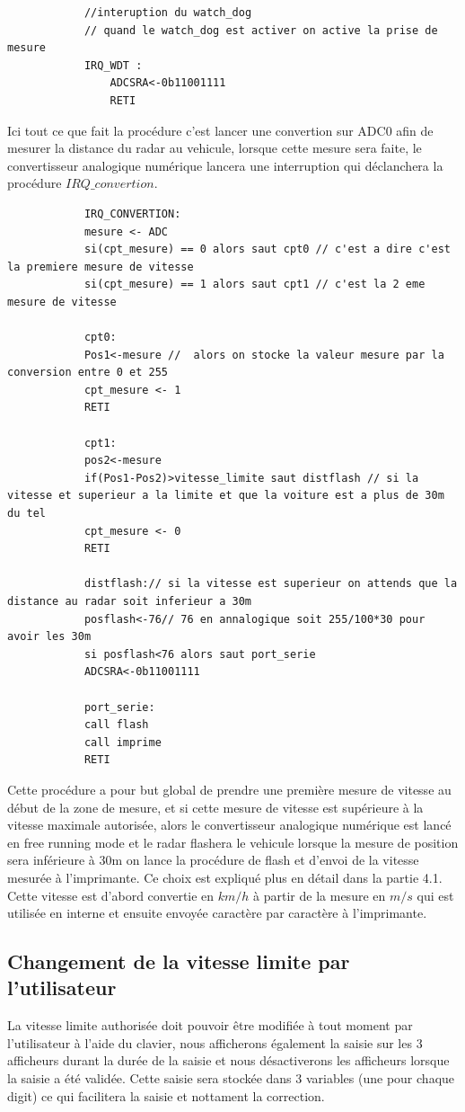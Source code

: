 \documentclass[a4paper, 12pt]{article}
\begin{document}
		\begin{lstlisting}
			//interuption du watch_dog
			// quand le watch_dog est activer on active la prise de mesure
			IRQ_WDT :
				ADCSRA<-0b11001111
				RETI
		\end{lstlisting}
		Ici tout ce que fait la procédure c'est lancer une convertion sur ADC0 afin de mesurer la distance du radar au vehicule, lorsque cette mesure sera faite, le convertisseur analogique numérique lancera une interruption qui déclanchera la procédure $IRQ\_convertion$.\\
		
		\begin{lstlisting}
			IRQ_CONVERTION:
			mesure <- ADC
			si(cpt_mesure) == 0 alors saut cpt0 // c'est a dire c'est la premiere mesure de vitesse 
			si(cpt_mesure) == 1 alors saut cpt1 // c'est la 2 eme mesure de vitesse
			
			cpt0:
			Pos1<-mesure //  alors on stocke la valeur mesure par la conversion entre 0 et 255
			cpt_mesure <- 1 
			RETI
			
			cpt1:
			pos2<-mesure
			if(Pos1-Pos2)>vitesse_limite saut distflash // si la vitesse et superieur a la limite et que la voiture est a plus de 30m du tel
			cpt_mesure <- 0
			RETI
			
			distflash:// si la vitesse est superieur on attends que la distance au radar soit inferieur a 30m
			posflash<-76// 76 en annalogique soit 255/100*30 pour avoir les 30m
			si posflash<76 alors saut port_serie 
			ADCSRA<-0b11001111
			
			port_serie:
			call flash 
			call imprime 
			RETI
		\end{lstlisting}
		Cette procédure a pour but global de prendre une première mesure de vitesse au début de la zone de mesure, et si cette mesure de vitesse est supérieure à la vitesse maximale autorisée, alors le convertisseur analogique numérique est lancé en free running mode et le radar flashera le vehicule lorsque la mesure de position sera inférieure à 30m on lance la procédure de flash et d'envoi de la vitesse mesurée à l'imprimante. Ce choix est expliqué plus en détail dans la partie 4.1.\\
		Cette vitesse est d'abord convertie en $km/h$ à partir de la mesure en $m/s$ qui est utilisée en interne et ensuite envoyée caractère par caractère à l'imprimante. 
		
		\subsection{Changement de la vitesse limite par l'utilisateur}
		La vitesse limite authorisée doit pouvoir être modifiée à tout moment par l'utilisateur à l'aide du clavier, nous afficherons également la saisie sur les 3 afficheurs durant la durée de la saisie et nous désactiverons les afficheurs lorsque la saisie a été validée. Cette saisie sera stockée dans 3 variables (une pour chaque digit) ce qui facilitera la saisie et nottament la correction.
		
\end{document}
